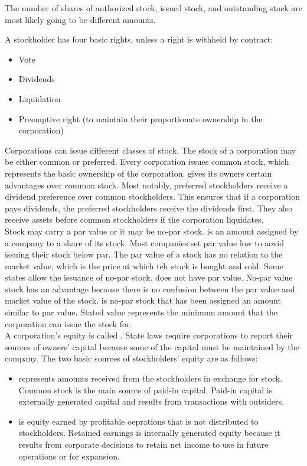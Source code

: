 \documentclass{article}
\begin{document}
\begin{remark}
  The number of shares of authorized stock, issued stock, and outstanding stock are most likely going to be different amounts. 
\end{remark}

A stockholder has four basic rights, unless a right is withheld by contract:
\begin{itemize}
  \item Vote 
  \item Dividends 
  \item Liquidation
  \item Preemptive right (to maintain their proportionate ownership in the corporation)
\end{itemize}

Corporations can issue different classes of stock. The stock of a corporation may be either common or preferred. Every corporation issues common stock, which represents the basic ownership of the corporation.  gives its owners certain advantages over common stock. Most notably, preferred stockholders receive a dividend preference over common stockholders. This ensures that if a corporation pays dividends, the preferred stockholders receive the dividends first. They also receive assets before common stockholders if the corporation liquidates. \\ 

Stock may carry a par value or it may be no-par stock.  is an amount assigned by a company to a share of its stock. Most companies set par value low to aovid issuing their stock below par. The par value of a stock has no relation to the market value, which is the price at which teh stock is bought and sold. Some states allow the issuance of no-par stock.  does not have par value. No-par value stock has an advantage because there is no confusion between the par value and market value of the stock.  is no-par stock that has been assigned an amount similar to par value. Stated value represents the minimum amount that the corporation can issue the stock for. \\ 

A corporation's equity is called . State laws require corporations to report their sources of owners' capital because some of the capital must be maintained by the company. The two basic sources of stockholders' equity are as follows:
\begin{itemize}
  \item {} represents amounts received from the stockholders in exchange for stock. Common stock is the main source of paid-in capital. Paid-in capital is externally generated capital and results from transactions with outsiders. 
  \item {} is equity earned by profitable oeprations that is not distributed to stockholders. Retained earnings is internally generated equity because it results from corporate decisions to retain net income to use in future operations or for expansion. 
\end{itemize}
\end{document}
